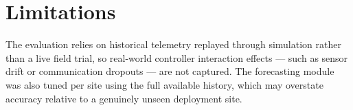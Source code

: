 \section{Limitations}
The evaluation relies on historical telemetry replayed through simulation rather than a live
field trial, so real-world controller interaction effects --- such as sensor drift or
communication dropouts --- are not captured. The forecasting module was also tuned per site
using the full available history, which may overstate accuracy relative to a genuinely
unseen deployment site.

